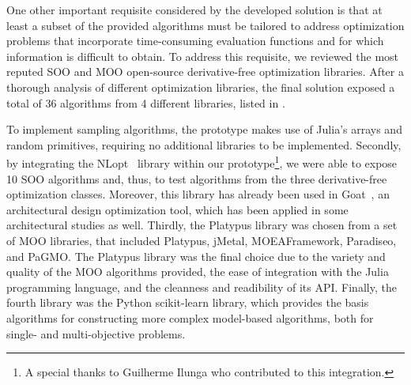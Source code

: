 One other important requisite considered by the developed solution is that at least a subset of the provided algorithms must be tailored to address optimization problems that incorporate time-consuming evaluation functions and for which information is difficult to obtain. To address this requisite, we reviewed the most reputed \ac{SOO} and \ac{MOO} open-source derivative-free optimization libraries. After a thorough analysis of different optimization libraries, the final solution exposed a total of 36 algorithms from 4 different libraries, listed in . 

To implement sampling algorithms, the prototype makes use of Julia's arrays and random primitives, requiring no additional libraries to be implemented. Secondly, by integrating the NLopt~\cite{NLOPT} library within our prototype\footnote{A special thanks to Guilherme Ilunga who contributed to this integration.}, we were able to expose 10 \ac{SOO} algorithms and, thus, to test algorithms from the three derivative-free optimization classes. Moreover, this library has already been used in Goat~\cite{GOAT}, an architectural design optimization tool, which has been applied in some architectural studies as well. Thirdly, the Platypus library was chosen from a set of \ac{MOO} libraries, that included Platypus, jMetal, MOEAFramework, Paradiseo, and PaGMO. The Platypus library was the final choice due to the variety and quality of the \ac{MOO} algorithms provided, the ease of integration with the Julia programming language, and the cleanness and readibility of its \ac{API}. Finally, the fourth library was the Python scikit-learn library, which provides the basis algorithms for constructing more complex model-based algorithms, both for single- and multi-objective problems.

